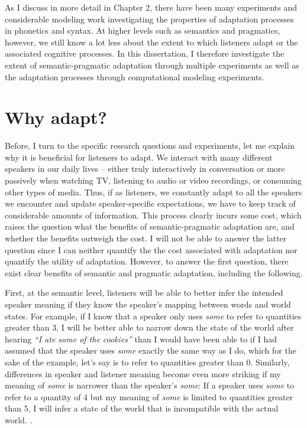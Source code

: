 As I discuss in more detail in Chapter 2, there have been many experiments and considerable modeling work investigating the properties of adaptation processes in phonetics and syntax. At higher levels such as semantics and pragmatics, however, we still know a lot less about the extent to which listeners adapt or the associated cognitive processes. In this dissertation, I therefore investigate the extent of semantic-pragmatic adaptation through multiple experiments as well as the adaptation processes through computational modeling experiments. 

\section{Why adapt?}
\label{sec:why-adapt}

Before, I turn to the specific research questions and experiments, let me explain why it is beneficial for listeners to adapt. We interact with many different speakers in our daily lives -- either truly interactively in conversation or more passively when watching TV, listening to audio or video recordings, or consuming other types of media. Thus, if as listeners, we constantly adapt to all the speakers we encounter and update speaker-specific expectations, we have to keep track of considerable amounts of information. This process clearly incurs some cost, which raises the question what the benefits of semantic-pragmatic adaptation are, and whether the benefits outweigh the cost. I will not be able to answer the latter question since I can neither quantify the 
the cost associated with adaptation nor quantify the utility of adaptation. However, to answer the first question, there exist clear benefits of semantic and pragmatic adaptation, including the following.

First, at the semantic level, listeners will be able to better infer the intended speaker meaning if they know the speaker's mapping between words and world states. For example, if I know that a speaker only uses \emph{some} to refer to quantities greater than 3, I will be better able to narrow down the state of the world after hearing \emph{``I ate some of the cookies''} than I would have been able to if I had assumed that the speaker uses \emph{some} exactly the same way as I do, which for the sake of the example, let's say is to refer to quantities greater than 0. Similarly, differences in speaker and listener meaning become even more striking if my meaning of \emph{some} is narrower than the speaker's \emph{some}: If a speaker uses \emph{some} to refer to a quantity of 4 but my meaning of \emph{some} is limited to quantities greater than 5, I will infer a state of the world that is incompatible with the actual world. .

